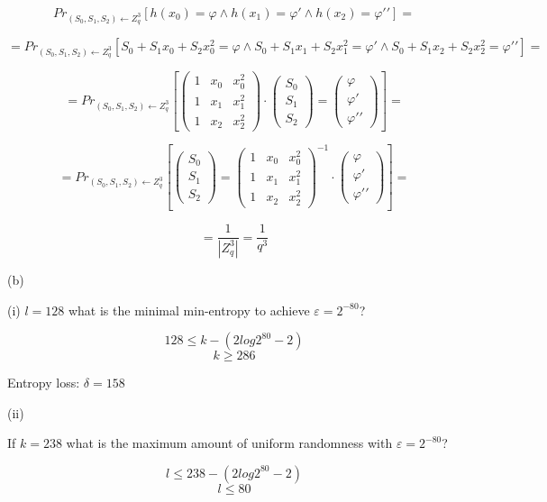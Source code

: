 \documentclass[11pt]{article}
\newcounter{t0d0_counter}
\begin{document}
$$ Pr_{(S_0,S_1,S_2)\gets Z_q^3}[h(x_0)= \varphi \wedge h(x_1)=\varphi \prime \wedge h(x_2)=\varphi \prime \prime]=$$

$$=Pr_{(S_0,S_1,S_2)\gets Z_q^3}[S_0+S_1x_0+S_2x_0^2=\varphi \wedge S_0+S_1x_1+S_2x_1^2=\varphi \prime \wedge S_0+S_1x_2+S_2x_2^2=\varphi \prime \prime]=$$


\[
=Pr_{(S_0,S_1,S_2)\gets Z_q^3}[
\begin{pmatrix}
	1 & x_0 & x_0^2 \\
	1 & x_1 & x_1^2 \\
	1 & x_2 & x_2^2
\end{pmatrix}
\cdot
\begin{pmatrix}
	S_0 \\
	S_1\\
	S_2
\end{pmatrix}
=
\begin{pmatrix}
\varphi \\
\varphi \prime \\
\varphi \prime \prime
\end{pmatrix}
]=
\]

\[
=Pr_{(S_0,S_1,S_2)\gets Z_q^3}[
\begin{pmatrix}
	S_0 \\
	S_1\\
	S_2
\end{pmatrix}
=
\begin{pmatrix}
	1 & x_0 & x_0^2 \\
	1 & x_1 & x_1^2 \\
	1 & x_2 & x_2^2
\end{pmatrix}^{-1}
\cdot
\begin{pmatrix}
\varphi \\
\varphi \prime \\
\varphi \prime \prime
\end{pmatrix}
]=
\]

$$= \frac{1}{|Z_q^3|}=\frac{1}{q^3}$$

(b)

(i) $ l = 128 $ what is the minimal min-entropy to achieve $\varepsilon = 2^{-80}$?

$$128 \leq k-(2log2^{80} -2)$$
$$k \geq 286$$

Entropy loss: $\delta = 158$

(ii)

If $ k = 238 $ what is the maximum amount of uniform randomness with $\varepsilon = 2^{-80}$?

$$l \leq 238-(2log2^{80}-2)$$
$$l \leq 80$$
\end{document}
